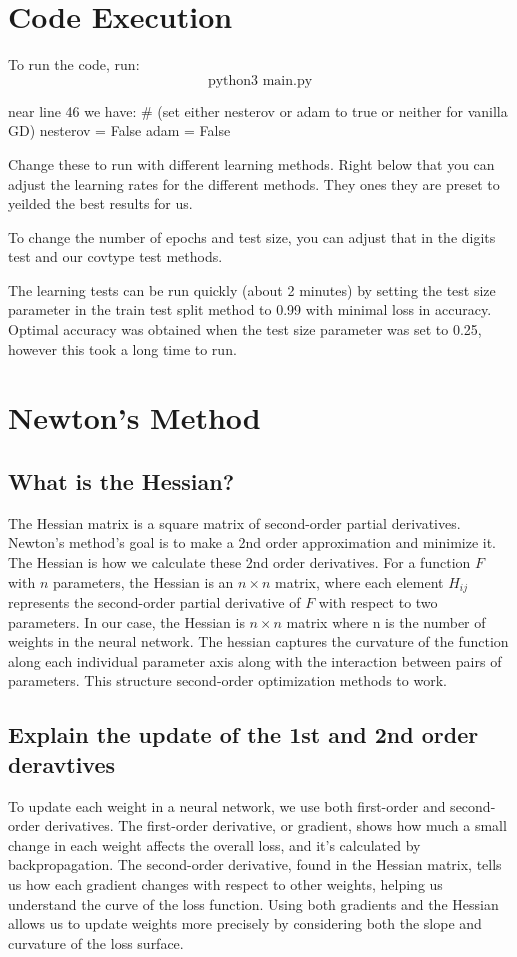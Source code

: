\documentclass{article}
\begin{document}
\newpage

\section{Code Execution}

To run the code, run:
\[\text{python3 main.py}\]

near line 46 we have: 
# (set either nesterov or adam to true or neither for vanilla GD)
nesterov = False
adam = False

Change these to run with different learning methods. Right below that you can adjust the learning rates for the different methods. They ones they are preset to yeilded the best results for us.

To change the number of epochs and test size, you can adjust that in the digits test and our covtype test methods.

The learning tests can be run quickly (about 2 minutes) by setting the test size parameter in the train test split method to 0.99 with minimal loss in accuracy. Optimal accuracy was obtained when the test size parameter was set to 0.25, however this took a long time to run.



\section{Newton's Method}

\subsection{What is the Hessian?}
The Hessian matrix is a square matrix of second-order partial derivatives. Newton's method's goal is to make a 2nd order approximation and minimize it. The Hessian is how we calculate these 2nd order derivatives. For a function \( F \) with \( n \) parameters, the Hessian is an \( n \times n \) matrix, where each element \( H_{ij} \) represents the second-order partial derivative of \( F \) with respect to two parameters. In our case, the Hessian is \( n \times n \) matrix where n is the number of weights in the neural network. The hessian captures the curvature of the function along each individual parameter axis along with the interaction between pairs of parameters. This structure second-order optimization methods to work.

\subsection{Explain the update of the 1st and 2nd order deravtives}
To update each weight in a neural network, we use both first-order and second-order derivatives. The first-order derivative, or gradient, shows how much a small change in each weight affects the overall loss, and it’s calculated by backpropagation. The second-order derivative, found in the Hessian matrix, tells us how each gradient changes with respect to other weights, helping us understand the curve of the loss function. Using both gradients and the Hessian allows us to update weights more precisely by considering both the slope and curvature of the loss surface.
\end{document}
